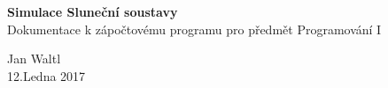 \begin{titlepage}
	\begin{center}
		\vspace*{8cm}
		\Huge{\textbf{Simulace Sluneční soustavy}}\\
		\vspace*{1cm}
		{\Large Dokumentace k zápočtovému programu pro předmět Programování I}\\
		\vfill
		
		\huge{Jan Waltl}\\
		\huge{12.Ledna 2017}
		\date{ccc}
	\end{center}
\end{titlepage}
	

